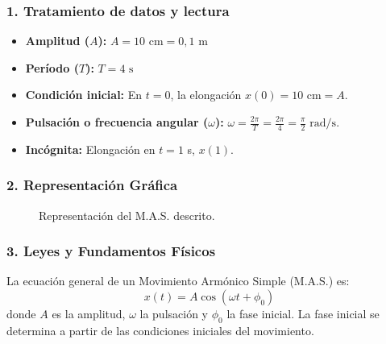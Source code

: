 \subsubsection*{1. Tratamiento de datos y lectura}
\begin{itemize}
    \item \textbf{Amplitud ($A$):} $A = 10 \text{ cm} = 0,1 \text{ m}$
    \item \textbf{Período ($T$):} $T = 4 \text{ s}$
    \item \textbf{Condición inicial:} En $t=0$, la elongación $x(0) = 10 \text{ cm} = A$.
    \item \textbf{Pulsación o frecuencia angular ($\omega$):} $\omega = \frac{2\pi}{T} = \frac{2\pi}{4} = \frac{\pi}{2} \text{ rad/s}$.
    \item \textbf{Incógnita:} Elongación en $t=1$ s, $x(1)$.
\end{itemize}

\subsubsection*{2. Representación Gráfica}
\begin{figure}[H]
    \centering
    \caption{Representación del M.A.S. descrito.}
\end{figure}

\subsubsection*{3. Leyes y Fundamentos Físicos}
La ecuación general de un Movimiento Armónico Simple (M.A.S.) es:
$$ x(t) = A \cos(\omega t + \phi_0) $$
donde $A$ es la amplitud, $\omega$ la pulsación y $\phi_0$ la fase inicial. La fase inicial se determina a partir de las condiciones iniciales del movimiento.

